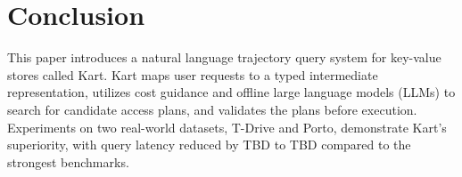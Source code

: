 \section{Conclusion}\label{sec:conclusion}

This paper introduces a natural language trajectory query system for key-value stores called Kart.
Kart maps user requests to a typed intermediate representation, utilizes cost guidance and offline large language models (LLMs) to search for candidate
access plans, and validates the plans before
execution.
Experiments on two real-world datasets, T-Drive and Porto, demonstrate Kart’s superiority, with query latency reduced by TBD to TBD compared to the strongest benchmarks.
